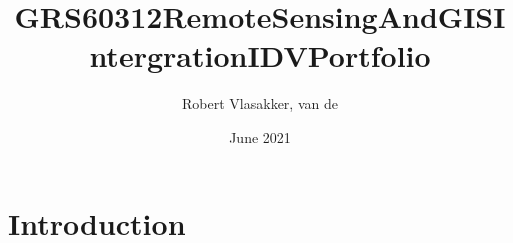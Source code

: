 \documentclass{article}
\title{GRS60312RemoteSensingAndGISIntergrationIDVPortfolio}
\author{Robert Vlasakker, van de}
\date{June 2021}
\begin{document}
\maketitle

\section{Introduction}
\end{document}
